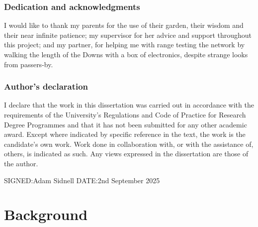 \documentclass[11pt]{article}
\begin{document}


\newpage
\section*{Dedication and acknowledgments}
I would like to thank my parents for the use of their garden, their wisdom and
their near infinite patience; my supervisor for her advice and support
throughout this project; and my partner, for helping me with range testing the
network by walking the length of the Downs with a box of electronics, despite
strange looks from passers-by.




\newpage
\section*{Author's declaration}
I declare that the work in this dissertation was carried out in accordance with
the requirements of the University's Regulations and Code of Practice for
Research Degree Programmes and that it has not been submitted for any other
academic award. Except where indicated by specific reference in the text, the
work is the candidate's own work. Work done in collaboration with, or with the
assistance of, others, is indicated as such. Any views expressed in the
dissertation are those of the author.


SIGNED:\qquad Adam Sidnell \qquad \qquad \qquad DATE:\qquad    2nd September
2025


\clearpage
\begingroup
\pagestyle{plain}
\vspace*{3cm}
\tableofcontents
\clearpage
\endgroup

\clearpage
\begingroup
\pagestyle{plain}
\vspace*{3cm}
\listoffigures
\clearpage
\endgroup




\part{Background}

\end{document}
